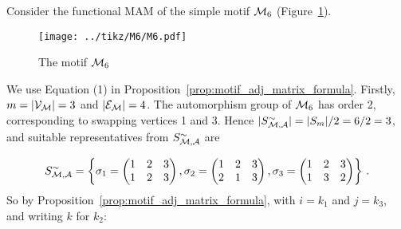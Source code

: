 \begin{example} \label{ex:motif_adj_calc}
Consider the functional MAM of the simple motif $\mathcal{M}_6$ (Figure~\ref{fig:M6}).
%
\begin{figure}[H]
\centering
\texttt{[image: ../tikz/M6/M6.pdf]}
\caption{The motif $\mathcal{M}_6$}
\label{fig:M6}
\end{figure}
%
We use Equation (1) in Proposition~\ref{prop:motif_adj_matrix_formula}. Firstly, $m = |\mathcal{V_M}| = 3$ and $|\mathcal{E_M}| = 4$. The automorphism group of $\mathcal{M}_6$ has order 2, corresponding to swapping vertices 1 and 3. Hence $|S_{\mathcal{M,A}}^\sim| = |S_m| / 2 = 6/2 = 3$, and suitable representatives from $S_{\mathcal{M,A}}^\sim$ are

$$ S_\ca{M,A}^\sim = \left\{
%
\sigma_1 =
\begin{pmatrix}
1 & 2 & 3 \\
1 & 2 & 3
\end{pmatrix},
%
\sigma_2 =
\begin{pmatrix}
1 & 2 & 3 \\
2 & 1 & 3
\end{pmatrix},
%
\sigma_3 =
\begin{pmatrix}
1 & 2 & 3 \\
1 & 3 & 2
\end{pmatrix}
\right\}\,. \vspace*{0.2cm}$$
%
So by Proposition~\ref{prop:motif_adj_matrix_formula}, with $i=k_1$ and $j=k_3$, and writing $k$ for $k_2$:


\end{example}
